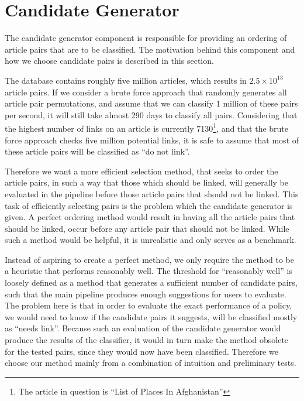 \section{Candidate Generator}
The candidate generator component is responsible for providing an ordering of article pairs that are to be classified. The motivation behind this component and how we choose candidate pairs is described in this section.


The database contains roughly five million articles, which results in $2.5 \times 10^{13}$ article pairs. If we consider a brute force approach that randomly generates all article pair permutations, and assume that we can classify 1 million of these pairs per second, it will still take almost 290 days to classify all pairs. Considering that the highest number of links on an article is currently 7130\footnote{The article in question is \enquote{List of Places In Afghanistan}}, and that the brute force approach checks five million potential links, it is safe to assume that most of these article pairs will be classified as \enquote{do not link}.

Therefore we want a more efficient selection method, that seeks to order the article pairs, in such a way that those which should be linked, will generally be evaluated in the pipeline before those article pairs that should not be linked. This task of efficiently selecting pairs is the problem which the candidate generator is given. A perfect ordering method would result in having all the article pairs that should be linked, occur before any article pair that should not be linked. While such a method would be helpful, it is unrealistic and only serves as a benchmark. 

Instead of aspiring to create a perfect method, we only require the method to be a heuristic that performs reasonably well. The threshold for \enquote{reasonably well} is loosely defined as a method that generates a sufficient number of candidate pairs, such that the main pipeline produces enough suggestions for users to evaluate. The problem here is that in order to evaluate the exact performance of a policy, we would need to know if the candidate pairs it suggests, will be classified mostly as \enquote{needs link}. Because such an evaluation of the candidate generator would produce the results of the classifier, it would in turn make the method obsolete for the tested pairs, since they would now have been classified.  Therefore we choose our method mainly from a combination of intuition and preliminary tests.

